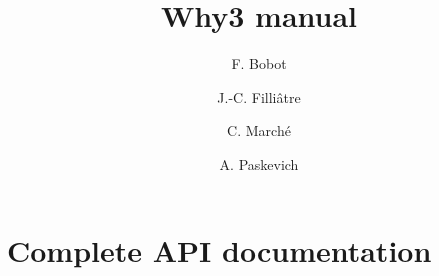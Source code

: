 \documentclass[a4paper]{memoir}
\begin{document}
\title{Why3 manual}
\author{F. Bobot \and J.-C. Filli\^atre \and C. March\'e \and A. Paskevich}
\maketitle

\cleardoublepage

\tableofcontents









\chapter{Complete API documentation}





\end{document}

